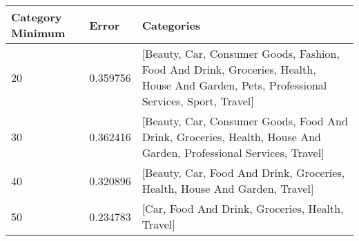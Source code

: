 \begin{tabular}{p{2cm}|p{2cm}|p{9cm}}
\toprule
 Category Minimum &    Error &                                                                                                                              Categories \\
\midrule
               20 & 0.359756 & [Beauty, Car, Consumer Goods, Fashion, Food And Drink, Groceries, Health, House And Garden, Pets, Professional Services, Sport, Travel] \\
               30 & 0.362416 &                       [Beauty, Car, Consumer Goods, Food And Drink, Groceries, Health, House And Garden, Professional Services, Travel] \\
               40 & 0.320896 &                                                              [Beauty, Car, Food And Drink, Groceries, Health, House And Garden, Travel] \\
               50 & 0.234783 &                                                                                        [Car, Food And Drink, Groceries, Health, Travel] \\
\bottomrule
\end{tabular}
